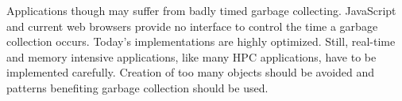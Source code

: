 Applications though may suffer from badly timed garbage collecting. JavaScript and current web browsers provide no interface to control the time a garbage collection occurs. Today's implementations are highly optimized. Still, real-time and memory intensive applications, like many HPC applications, have to be implemented carefully. Creation of too many objects should be avoided and patterns benefiting garbage collection should be used. \cite{browsergc}
